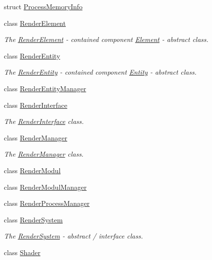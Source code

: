 \begin{DoxyCompactItemize}
struct \hyperlink{structEngine_1_1ProcessMemoryInfo}{Process\+Memory\+Info}
\item 
class \hyperlink{classEngine_1_1RenderElement}{Render\+Element}
\begin{DoxyCompactList}\small\item\em The \hyperlink{classEngine_1_1RenderElement}{Render\+Element} -\/ contained component \hyperlink{classEngine_1_1Element}{Element} -\/ abstract class. \end{DoxyCompactList}\item 
class \hyperlink{classEngine_1_1RenderEntity}{Render\+Entity}
\begin{DoxyCompactList}\small\item\em The \hyperlink{classEngine_1_1RenderEntity}{Render\+Entity} -\/ contained component \hyperlink{classEngine_1_1Entity}{Entity} -\/ abstract class. \end{DoxyCompactList}\item 
class \hyperlink{classEngine_1_1RenderEntityManager}{Render\+Entity\+Manager}
\item 
class \hyperlink{classEngine_1_1RenderInterface}{Render\+Interface}
\begin{DoxyCompactList}\small\item\em The \hyperlink{classEngine_1_1RenderInterface}{Render\+Interface} class. \end{DoxyCompactList}\item 
class \hyperlink{classEngine_1_1RenderManager}{Render\+Manager}
\begin{DoxyCompactList}\small\item\em The \hyperlink{classEngine_1_1RenderManager}{Render\+Manager} class. \end{DoxyCompactList}\item 
class \hyperlink{classEngine_1_1RenderModul}{Render\+Modul}
\item 
class \hyperlink{classEngine_1_1RenderModulManager}{Render\+Modul\+Manager}
\item 
class \hyperlink{classEngine_1_1RenderProcessManager}{Render\+Process\+Manager}
\item 
class \hyperlink{classEngine_1_1RenderSystem}{Render\+System}
\begin{DoxyCompactList}\small\item\em The \hyperlink{classEngine_1_1RenderSystem}{Render\+System} -\/ abstract / interface class. \end{DoxyCompactList}\item 
class \hyperlink{classEngine_1_1Shader}{Shader}

\end{DoxyCompactItemize}
